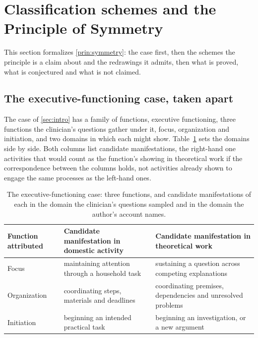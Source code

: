 \section{Classification schemes and the Principle of Symmetry}
\label{sec:symmetry}

This section formalizes \autoref{prin:symmetry}: the case first, then the schemes the principle is a claim about and the redrawings it admits, then what is proved, what is conjectured and what is not claimed.

\subsection{The executive-functioning case, taken apart}
\label{sec:ef-case}

The case of \autoref{sec:intro} has a family of functions, executive functioning, three functions the clinician's questions gather under it, focus, organization and initiation, and two domains in which each might show. Table~\ref{tab:manifestations} sets the domains side by side. Both columns list candidate manifestations, the right-hand one activities that would count as the function's showing in theoretical work if the correspondence between the columns holds, not activities already shown to engage the same processes as the left-hand ones.

\begin{table}[t]
\centering
\small
\caption{The executive-functioning case: three functions, and candidate manifestations of each in the domain the clinician's questions sampled and in the domain the author's account names.}
\label{tab:manifestations}
\begin{tabular}{@{}lp{5.2cm}p{5.6cm}@{}}
\toprule
Function attributed & Candidate manifestation in domestic activity & Candidate manifestation in theoretical work \\
\midrule
Focus & maintaining attention through a household task & sustaining a question across competing explanations \\
\addlinespace
Organization & coordinating steps, materials and deadlines & coordinating premises, dependencies and unresolved problems \\
\addlinespace
Initiation & beginning an intended practical task & beginning an investigation, or a new argument \\
\bottomrule
\end{tabular}
\end{table}


